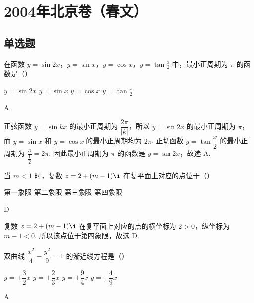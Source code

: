\chapter{2004年北京卷（春文）}

\section{单选题}

\begin{problem}
在函数 \(y=\sin 2x\)，\(y=\sin x\)，\(y=\cos x\)，\(y=\tan\frac{x}{2}\) 中，最小正周期为 \(\pi\) 的函数是（\quad）

\choices
    {\(y=\sin 2x\)}
    {\(y=\sin x\)}
    {\(y=\cos x\)}
    {\(y=\tan\frac{x}{2}\)}
\end{problem}

\begin{answer}
A
\end{answer}

\begin{solution}
正弦函数 \(y=\sin kx\) 的最小正周期为 \(\dfrac{2\pi}{|k|}\)，所以 \(y=\sin 2x\) 的最小正周期为 \(\pi\)，而 \(y=\sin x\) 和 \(y=\cos x\) 的最小正周期均为 \(2\pi\). 正切函数 \(y=\tan\dfrac{x}{2}\) 的最小正周期为 \(\dfrac{\pi}{\frac{1}{2}}=2\pi\). 因此最小正周期为 \(\pi\) 的函数是 \(y=\sin 2x\)，故选 A.
\end{solution}


\begin{problem}
当 \(m<1\) 时，复数 \(z=2+(m-1)\i\) 在复平面上对应的点位于（\quad）

\choices
    {第一象限}
    {第二象限}
    {第三象限}
    {第四象限}
\end{problem}

\begin{answer}
D
\end{answer}

\begin{solution}
复数 \(z=2+(m-1)\i\) 在复平面上对应的点的横坐标为 \(2>0\)，纵坐标为 \(m-1<0\). 所以该点位于第四象限，故选 D.
\end{solution}


\begin{problem}
双曲线 \(\dfrac{x^{2}}{4}-\dfrac{y^{2}}{9}=1\) 的渐近线方程是（\quad）

\choices
    {\(y=\pm\dfrac{3}{2}x\)}
    {\(y=\pm\dfrac{2}{3}x\)}
    {\(y=\pm\dfrac{9}{4}x\)}
    {\(y=\pm\dfrac{4}{9}x\)}
\end{problem}

\begin{answer}
A
\end{answer}

